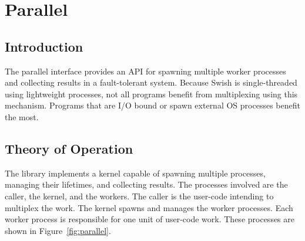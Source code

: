 %
%
%

\chapter {Parallel}\label{chap:parallel}

\section{Introduction}

The parallel interface provides an API for spawning multiple worker
processes and collecting results in a fault-tolerant system. Because
Swish is single-threaded using lightweight processes, not all programs
benefit from multiplexing using this mechanism. Programs that are I/O
bound or spawn external OS processes benefit the most.

\section{Theory of Operation}

The  library implements a kernel capable of
spawning multiple processes, managing their lifetimes, and collecting
results. The processes involved are the caller, the kernel, and the
workers. The caller is the user-code intending to multiplex the
work. The kernel spawns and manages the worker processes. Each worker
process is responsible for one unit of user-code work. These processes
are shown in Figure~\ref{fig:parallel}.

